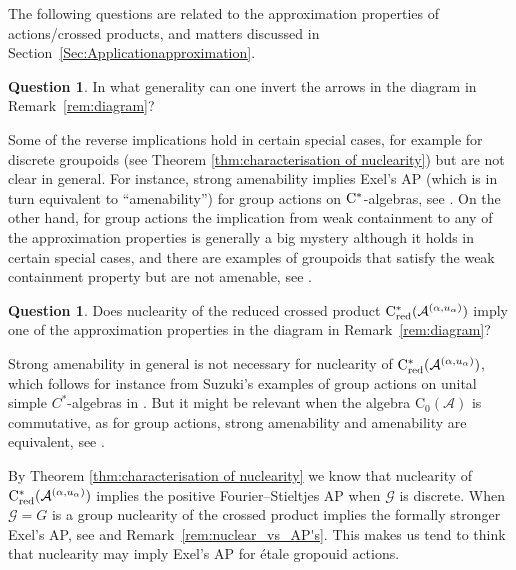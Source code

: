 \documentclass[11 pt, leqno]{amsart}
\numberwithin{equation}{section}
\theoremstyle{plain}
\theoremstyle{definition}
\newtheorem {quest} [thm]{Question}
\newcommand*{\contz}{\mathrm{C_0}}%
\DeclareMathOperator{\red}{red}%
\newcommand{\G}{\mathcal G} %
\newcommand{\A}{\mathcal A}
\newcommand{\cst}{\ifmmode\mathrm{C}^*\else{$\mathrm{C}^*$}\fi}
\begin{document}
\vspace*{0.2 cm}


The following questions are related to the approximation properties of actions/crossed products, and matters discussed in Section~\ref{Sec:Applicationapproximation}.

\begin{quest} \label{quest:diagram}
In what generality can one invert the arrows in the diagram in Remark~\ref{rem:diagram}?
\end{quest}

Some of the reverse implications hold in certain special cases, for example for discrete groupoids (see Theorem \ref{thm:characterisation of nuclearity}) but are not clear in general. 
For instance, strong amenability implies Exel's AP (which is in turn equivalent to ``amenability'') for group actions on $\cst$-algebras, see \cite[Theorem~4.9]{BussEchterhoffWillett}. 
On the other hand, for group actions the implication from weak containment to any of the approximation properties is generally a big mystery although it holds in certain special cases, and there are examples of groupoids that satisfy the weak containment property but are not amenable, see \cite{Willett}.

\begin{quest}
Does nuclearity of the reduced crossed product $\cst_{\red}(\A^{(\alpha,u_{\alpha})})$ imply one of the approximation properties in the diagram in Remark~\ref{rem:diagram}?
\end{quest}

Strong amenability in general is not necessary for nuclearity of $\cst_{\red}(\A^{(\alpha,u_{\alpha})})$, which follows for instance from Suzuki's examples of group actions on unital simple $C^*$-algebras in \cite{Suzuki}.
But it might be relevant when the algebra $\contz(\A)$ is commutative, as for group actions, strong amenability and amenability are equivalent, see \cite[Th\'eor\`eme 4.9]{Clare1}.

By Theorem \ref{thm:characterisation of nuclearity} we know that nuclearity of $\cst_{\red}(\A^{(\alpha,u_{\alpha})})$ implies the positive Fourier--Stieltjes AP when $\G$ is discrete.
When $\G=G$ is a group nuclearity of the crossed product implies the formally stronger Exel's AP, see \cite[Corollary 4.11]{BussEchterhoffWillett} and Remark~\ref{rem:nuclear_vs_AP's}.
This makes us tend to think that nuclearity may imply Exel's AP for \'etale gropouid actions.

\end{document}
